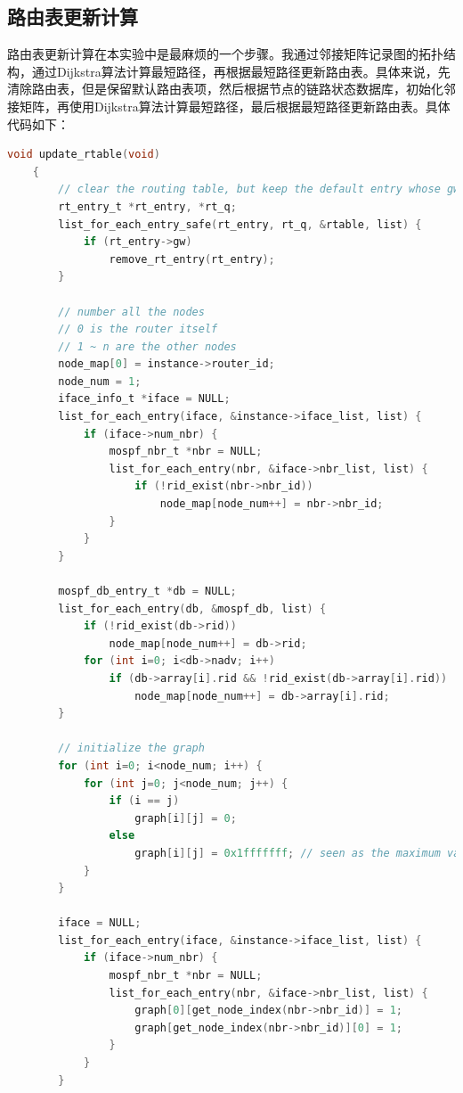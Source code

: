 \documentclass[UTF8]{report}
\begin{document}
\subsection{路由表更新计算}

路由表更新计算在本实验中是最麻烦的一个步骤。我通过邻接矩阵记录图的拓扑结构，通过Dijkstra算法计算最短路径，再根据最短路径更新路由表。具体来说，先清除路由表，但是保留默认路由表项，然后根据节点的链路状态数据库，初始化邻接矩阵，再使用Dijkstra算法计算最短路径，最后根据最短路径更新路由表。具体代码如下：

\begin{lstlisting}[language=C]
    void update_rtable(void)
    {
        // clear the routing table, but keep the default entry whose gw is 0
        rt_entry_t *rt_entry, *rt_q;
        list_for_each_entry_safe(rt_entry, rt_q, &rtable, list) {
            if (rt_entry->gw) 
                remove_rt_entry(rt_entry);
        }
    
        // number all the nodes
        // 0 is the router itself
        // 1 ~ n are the other nodes
        node_map[0] = instance->router_id;
        node_num = 1;
        iface_info_t *iface = NULL;
        list_for_each_entry(iface, &instance->iface_list, list) {
            if (iface->num_nbr) {
                mospf_nbr_t *nbr = NULL;
                list_for_each_entry(nbr, &iface->nbr_list, list) {
                    if (!rid_exist(nbr->nbr_id)) 
                        node_map[node_num++] = nbr->nbr_id;
                }
            }
        }
    
        mospf_db_entry_t *db = NULL;
        list_for_each_entry(db, &mospf_db, list) {
            if (!rid_exist(db->rid))
                node_map[node_num++] = db->rid;
            for (int i=0; i<db->nadv; i++)
                if (db->array[i].rid && !rid_exist(db->array[i].rid))
                    node_map[node_num++] = db->array[i].rid;
        }
    
        // initialize the graph
        for (int i=0; i<node_num; i++) {
            for (int j=0; j<node_num; j++) {
                if (i == j)
                    graph[i][j] = 0;
                else
                    graph[i][j] = 0x1fffffff; // seen as the maximum value
            }
        }
    
        iface = NULL;
        list_for_each_entry(iface, &instance->iface_list, list) {
            if (iface->num_nbr) {
                mospf_nbr_t *nbr = NULL;
                list_for_each_entry(nbr, &iface->nbr_list, list) {
                    graph[0][get_node_index(nbr->nbr_id)] = 1;
                    graph[get_node_index(nbr->nbr_id)][0] = 1;
                }
            }
        }
    

\end{lstlisting}
\end{document}
